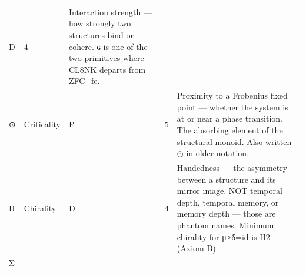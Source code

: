 \begin{longtable}[]{@{}lllll@{}}
\begin{minipage}[t]{0.16\columnwidth}
D\strut
\end{minipage} & \begin{minipage}[t]{0.16\columnwidth}\raggedright
4\strut
\end{minipage} & \begin{minipage}[t]{0.27\columnwidth}\raggedright
Interaction strength --- how strongly two structures bind or cohere. ɢ
is one of the two primitives where CL8NK departs from ZFC\_fe.\strut
\end{minipage}\tabularnewline
\begin{minipage}[t]{0.14\columnwidth}\raggedright
⊙\strut
\end{minipage} & \begin{minipage}[t]{0.12\columnwidth}\raggedright
Criticality\strut
\end{minipage} & \begin{minipage}[t]{0.16\columnwidth}\raggedright
P\strut
\end{minipage} & \begin{minipage}[t]{0.16\columnwidth}\raggedright
5\strut
\end{minipage} & \begin{minipage}[t]{0.27\columnwidth}\raggedright
Proximity to a Frobenius fixed point --- whether the system is at or
near a phase transition. The absorbing element of the structural monoid.
Also written $\odot$ in older notation.\strut
\end{minipage}\tabularnewline
\begin{minipage}[t]{0.14\columnwidth}\raggedright
Ħ\strut
\end{minipage} & \begin{minipage}[t]{0.12\columnwidth}\raggedright
Chirality\strut
\end{minipage} & \begin{minipage}[t]{0.16\columnwidth}\raggedright
D\strut
\end{minipage} & \begin{minipage}[t]{0.16\columnwidth}\raggedright
4\strut
\end{minipage} & \begin{minipage}[t]{0.27\columnwidth}\raggedright
Handedness --- the asymmetry between a structure and its mirror image.
NOT temporal depth, temporal memory, or memory depth --- those are
phantom names. Minimum chirality for μ∘δ=id is H2 (Axiom B).\strut
\end{minipage}\tabularnewline
\begin{minipage}[t]{0.14\columnwidth}\raggedright
Σ\strut
\end{minipage} & \begin{minipage}[t]{0.12\columnwidth}\raggedright

\end{minipage}
\end{longtable}
